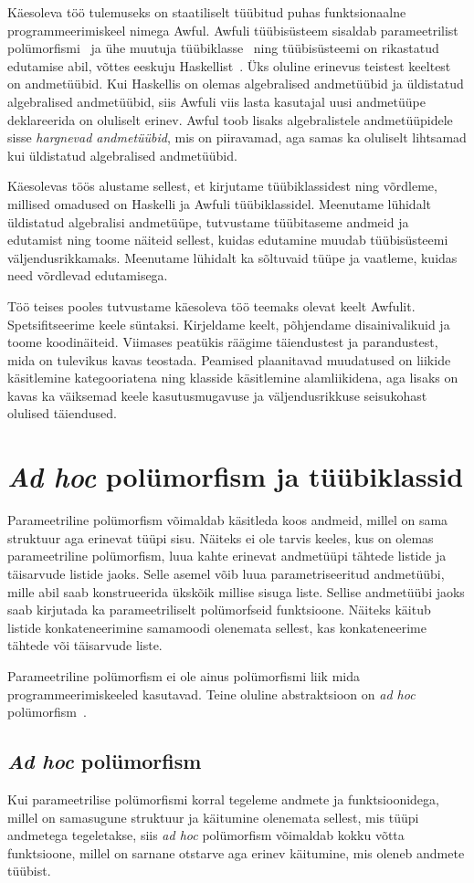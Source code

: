 \documentclass[12pt]{article}
\newcommand\peatykk[1]{
  \clearpage
  \section{#1}}
\begin{document}
    Käesoleva töö tulemuseks on staatiliselt tüübitud puhas funktsionaalne programmeerimiskeel nimega Awful. Awfuli tüübisüsteem sisaldab parameetrilist polümorfismi~\cite{Fun} ja ühe muutuja tüübiklasse~\cite{How} ning tüübisüsteemi on rikastatud edutamise abil, võttes eeskuju Haskellist~\cite{Giv}. Üks oluline erinevus teistest keeltest on andmetüübid. Kui Haskellis on olemas algebralised andmetüübid ja üldistatud algebralised andmetüübid, siis Awfuli viis lasta kasutajal uusi andmetüüpe deklareerida on oluliselt erinev. Awful toob lisaks algebralistele andmetüüpidele sisse \textit{hargnevad andmetüübid}, mis on piiravamad, aga samas ka oluliselt lihtsamad kui üldistatud algebralised andmetüübid.

    Käesolevas töös alustame sellest, et kirjutame tüübiklassidest ning võrdleme, millised omadused on Haskelli ja Awfuli tüübiklassidel. Meenutame lühidalt üldistatud algebralisi andmetüüpe, tutvustame tüübitaseme andmeid ja edutamist ning toome näiteid sellest, kuidas edutamine muudab tüübisüsteemi väljendusrikkamaks. Meenutame lühidalt ka sõltuvaid tüüpe ja vaatleme, kuidas need võrdlevad edutamisega.

    Töö teises pooles tutvustame käesoleva töö teemaks olevat keelt Awfulit. Spetsifitseerime keele süntaksi. Kirjeldame keelt, põhjendame disainivalikuid ja toome koodinäiteid. Viimases peatükis räägime täiendustest ja parandustest, mida on tulevikus kavas teostada. Peamised plaanitavad muudatused on liikide käsitlemine kategooriatena ning klasside käsitlemine alamliikidena, aga lisaks on kavas ka väiksemad keele kasutusmugavuse ja väljendusrikkuse seisukohast olulised täiendused.
  \peatykk{\textit{Ad hoc} polümorfism ja tüübiklassid}
    Parameetriline polümorfism võimaldab käsitleda koos andmeid, millel on sama struktuur aga erinevat tüüpi sisu. Näiteks ei ole tarvis keeles, kus on olemas parameetriline polümorfism, luua kahte erinevat andmetüüpi tähtede listide ja täisarvude listide jaoks. Selle asemel võib luua parametriseeritud andmetüübi, mille abil saab konstrueerida ükskõik millise sisuga liste. Sellise andmetüübi jaoks saab kirjutada ka parameetriliselt polümorfseid funktsioone. Näiteks käitub listide konkateneerimine samamoodi olenemata sellest, kas konkateneerime tähtede või täisarvude liste.

    Parameetriline polümorfism ei ole ainus polümorfismi liik mida programmeerimiskeeled kasutavad. Teine oluline abstraktsioon on \textit{ad hoc} polümorfism~\cite{Fun}.
    \subsection{\textit{Ad hoc} polümorfism}\label{peidetudargumendid}
      Kui parameetrilise polümorfismi korral tegeleme andmete ja funktsioonidega, millel on samasugune struktuur ja käitumine olenemata sellest, mis tüüpi andmetega tegeletakse, siis \textit{ad hoc} polümorfism võimaldab kokku võtta funktsioone, millel on sarnane otstarve aga erinev käitumine, mis oleneb andmete tüübist.
\end{document}
